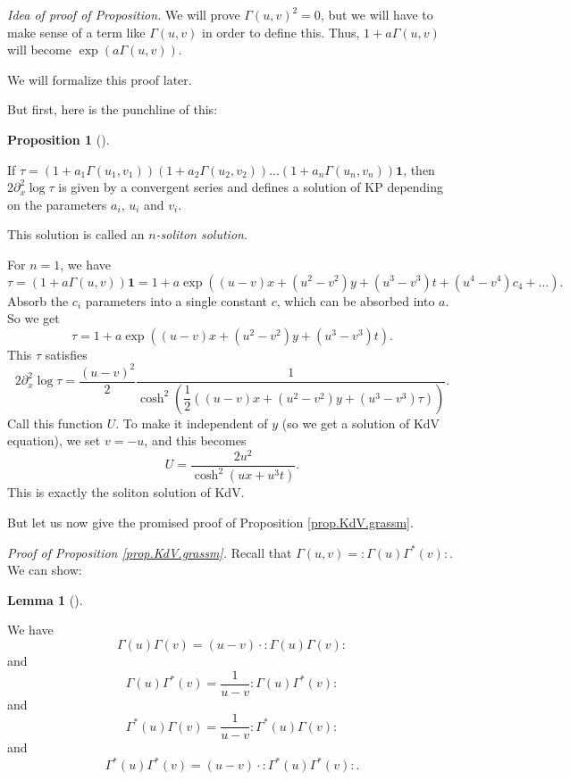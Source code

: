 \documentclass
[numbers=enddot,12pt,final,onecolumn,german,notitlepage]{scrartcl}%
\theoremstyle{definition}
\newtheorem{lem}[theo]{Lemma}
\newenvironment{lemma}[1][]
{\begin{lem}[#1]\begin{leftbar}}
{\end{leftbar}\end{lem}}
\newtheorem{prop}[theo]{Proposition}
\newenvironment{proposition}[1][]
{\begin{prop}[#1]\begin{leftbar}}
{\end{leftbar}\end{prop}}
\begin{document}
\textit{Idea of proof of Proposition.} We will prove $\Gamma\left(
u,v\right)  ^{2}=0$, but we will have to make sense of a term like
$\Gamma\left(  u,v\right)  $ in order to define this. Thus, $1+a\Gamma\left(
u,v\right)  $ will become $\exp\left(  a\Gamma\left(  u,v\right)  \right)  $.

We will formalize this proof later.

But first, here is the punchline of this:

\begin{proposition}
If $\tau=\left(  1+a_{1}\Gamma\left(  u_{1},v_{1}\right)  \right)  \left(
1+a_{2}\Gamma\left(  u_{2},v_{2}\right)  \right)  ...\left(  1+a_{n}%
\Gamma\left(  u_{n},v_{n}\right)  \right)  \mathbf{1}$, then $2\partial
_{x}^{2}\log\tau$ is given by a convergent series and defines a solution of KP
depending on the parameters $a_{i}$, $u_{i}$ and $v_{i}$.
\end{proposition}

This solution is called an $n$\textit{-soliton solution}.

For $n=1$, we have%
\[
\tau=\left(  1+a\Gamma\left(  u,v\right)  \right)  \mathbf{1}=1+a\exp\left(
\left(  u-v\right)  x+\left(  u^{2}-v^{2}\right)  y+\left(  u^{3}%
-v^{3}\right)  t+\left(  u^{4}-v^{4}\right)  c_{4}+...\right)  .
\]
Absorb the $c_{i}$ parameters into a single constant $c$, which can be
absorbed into $a$. So we get%
\[
\tau=1+a\exp\left(  \left(  u-v\right)  x+\left(  u^{2}-v^{2}\right)
y+\left(  u^{3}-v^{3}\right)  t\right)  .
\]
This $\tau$ satisfies
\[
2\partial_{x}^{2}\log\tau=\dfrac{\left(  u-v\right)  ^{2}}{2}\dfrac{1}%
{\cosh^{2}\left(  \dfrac{1}{2}\left(  \left(  u-v\right)  x+\left(
u^{2}-v^{2}\right)  y+\left(  u^{3}-v^{3}\right)  \tau\right)  \right)  }.
\]
Call this function $U$. To make it independent of $y$ (so we get a solution of
KdV equation), we set $v=-u$, and this becomes%
\[
U=\dfrac{2u^{2}}{\cosh^{2}\left(  ux+u^{3}t\right)  }.
\]
This is exactly the soliton solution of KdV.

But let us now give the promised proof of Proposition \ref{prop.KdV.grassm}.

\textit{Proof of Proposition \ref{prop.KdV.grassm}.} Recall that
$\Gamma\left(  u,v\right)  =:\Gamma\left(  u\right)  \Gamma^{\ast}\left(
v\right)  :$. We can show:

\begin{lemma}
\label{lem.KdV.GG}We have%
\[
\Gamma\left(  u\right)  \Gamma\left(  v\right)  =\left(  u-v\right)
\cdot\left.  :\Gamma\left(  u\right)  \Gamma\left(  v\right)  :\right.
\]
and%
\[
\Gamma\left(  u\right)  \Gamma^{\ast}\left(  v\right)  =\dfrac{1}{u-v}\left.
:\Gamma\left(  u\right)  \Gamma^{\ast}\left(  v\right)  :\right.
\]
and%
\[
\Gamma^{\ast}\left(  u\right)  \Gamma\left(  v\right)  =\dfrac{1}{u-v}\left.
:\Gamma^{\ast}\left(  u\right)  \Gamma\left(  v\right)  :\right.
\]
and%
\[
\Gamma^{\ast}\left(  u\right)  \Gamma^{\ast}\left(  v\right)  =\left(
u-v\right)  \cdot\left.  :\Gamma^{\ast}\left(  u\right)  \Gamma^{\ast}\left(
v\right)  :\right.  .
\]

\end{lemma}
\end{document}
